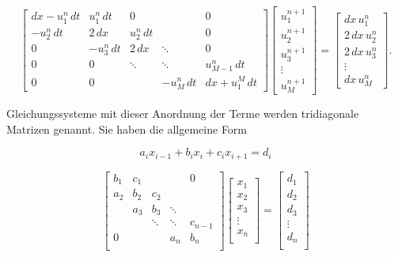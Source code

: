 \begin{equation}
\left[{\begin{matrix}
{dx- u_{1}^{n}\, dt}&{ u_{1}^{n} \, dt}&{0}&{}&{0}\\[5pt]
{-u_{2}^{n} \, dt}&{ 2 \, dx}&{ u_{2}^{n} \, dt}&{}&{0}\\[5pt]
{0}&{-u_{3}^{n} \, dt}&{ 2 \, dx}&\ddots &{0}\\[5pt]
{0}&{0}&\ddots &\ddots &{ u_{M-1}^{n} \, dt}\\[5pt]
{0}&{0}&{}&{-u_{M}^{n} \, dt}&{dx + u_{1}^{M}\, dt}
\end{matrix}}
\right]\left[{\begin{matrix}
{ u_{1}^{n+1}}\\[5pt]
{ u_{2}^{n+1}}\\[5pt]
{ u_{3}^{n+1}}\\[5pt]
\vdots \\[5pt]
{ u_{M}^{n+1}}
\end{matrix}}\right]
=\left[{\begin{matrix}
{dx \, u_{1}^{n}}\\[5pt]
{ 2 \, dx \, u_{2}^{n}}\\[5pt]
{ 2 \, dx \, u_{3}^{n}}\\[5pt]
\vdots \\[5pt]
{dx \, u_{M}^{n}}
\end{matrix}}\right].
  \end{equation}

Gleichungssysteme mit dieser Anordnung der Terme werden tridiagonale Matrizen genannt.
Sie haben die allgemeine Form

  \begin{equation}
    a_{i}x_{{i-1}}+b_{i}x_{i}+c_{i}x_{{i+1}}=d_{i}
  \end{equation}


  \begin{equation}
    \begin{bmatrix}{b_{1}}&{c_{1}}&{}&{}&{0}\\
      {a_{2}}&{b_{2}}&{c_{2}}&{}&{}\\
      {}&{a_{3}}&{b_{3}}&\ddots &{}\\
      {}&{}&\ddots &\ddots &{c_{n-1}}\\
      {0}&{}&{}&{a_{n}}&{b_{n}}\\
      \end{bmatrix}
      \begin{bmatrix}{x_{1}}\\
      {x_{2}}\\{x_{3}}\\\vdots \\
      {x_{n}}\\
      \end{bmatrix}
      =
      \begin{bmatrix}{d_{1}}\\
      {d_{2}}\\{d_{3}}\\
      \vdots \\{d_{n}}\\
    \end{bmatrix}
  \end{equation}
  
